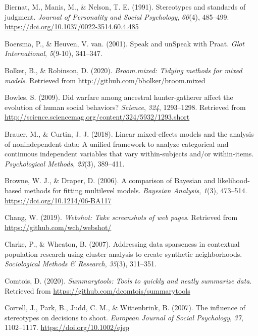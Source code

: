 \documentclass[
  english,
  man, noextraspace,floatsintext]{apa6}
\newlength{\cslhangindent}
\newenvironment{cslreferences}%
  {\setlength{\parindent}{0pt}%
  \everypar{\setlength{\hangindent}{\cslhangindent}}\ignorespaces}%
  {\par}
\begin{document}
\begin{cslreferences}
\leavevmode\hypertarget{ref-Biernat1991}{}%
Biernat, M., Manis, M., \& Nelson, T. E. (1991). Stereotypes and standards of judgment. \emph{Journal of Personality and Social Psychology}, \emph{60}(4), 485--499. \url{https://doi.org/10.1037/0022-3514.60.4.485}

\leavevmode\hypertarget{ref-Boersma2001}{}%
Boersma, P., \& Heuven, V. van. (2001). Speak and unSpeak with Praat. \emph{Glot International}, \emph{5}(9-10), 341--347.

\leavevmode\hypertarget{ref-R-broom.mixed}{}%
Bolker, B., \& Robinson, D. (2020). \emph{Broom.mixed: Tidying methods for mixed models}. Retrieved from \url{http://github.com/bbolker/broom.mixed}

\leavevmode\hypertarget{ref-Bowles2009}{}%
Bowles, S. (2009). Did warfare among ancestral hunter-gatherer affect the evolution of human social behaviors? \emph{Science}, \emph{324}, 1293--1298. Retrieved from \url{http://science.sciencemag.org/content/324/5932/1293.short}

\leavevmode\hypertarget{ref-Brauer2018}{}%
Brauer, M., \& Curtin, J. J. (2018). Linear mixed-effects models and the analysis of nonindependent data: A unified framework to analyze categorical and continuous independent variables that vary within-subjects and/or within-items. \emph{Psychological Methods}, \emph{23}(3), 389--411.

\leavevmode\hypertarget{ref-Browne2006}{}%
Browne, W. J., \& Draper, D. (2006). A comparison of Bayesian and likelihood-based methods for fitting multilevel models. \emph{Bayesian Analysis}, \emph{1}(3), 473--514. \url{https://doi.org/10.1214/06-BA117}

\leavevmode\hypertarget{ref-R-webshot}{}%
Chang, W. (2019). \emph{Webshot: Take screenshots of web pages}. Retrieved from \url{https://github.com/wch/webshot/}

\leavevmode\hypertarget{ref-Clarke2007}{}%
Clarke, P., \& Wheaton, B. (2007). Addressing data sparseness in contextual population research using cluster analysis to create synthetic neighborhoods. \emph{Sociological Methods \& Research}, \emph{35}(3), 311--351.

\leavevmode\hypertarget{ref-R-summarytools}{}%
Comtois, D. (2020). \emph{Summarytools: Tools to quickly and neatly summarize data}. Retrieved from \url{https://github.com/dcomtois/summarytools}

\leavevmode\hypertarget{ref-Correll2007}{}%
Correll, J., Park, B., Judd, C. M., \& Wittenbrink, B. (2007). The influence of stereotypes on decisions to shoot. \emph{European Journal of Social Psychology}, \emph{37}, 1102--1117. \url{https://doi.org/10.1002/ejsp}


\end{cslreferences}
\end{document}
